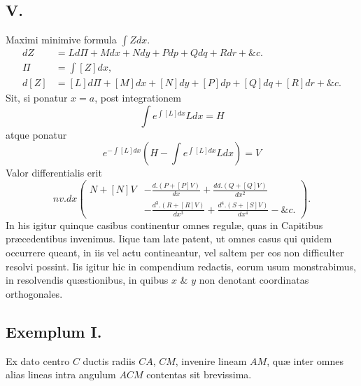 \subsection*{V.}
Maximi minimive formula $\int Zdx$.
\[\begin{aligned}dZ&=Ld\Pi+Mdx+Ndy+Pdp+Qdq+Rdr+\&c.\\\Pi&=\int[Z]dx,\\d[Z]&=[L]d\Pi+[M]dx+[N]dy+[P]dp+[Q]dq+[R]dr+\&c.\end{aligned}\]
Sit, si ponatur $x=a$, post integrationem
\[\int e^{\int[L]dx}Ldx=H\]
atque ponatur
\[e^{-\int[L]dx}\left(H-\int e^{\int[L]dx}Ldx\right)=V\]
Valor differentialis erit
\[nv.dx\left(\begin{aligned}N+[N]V&-\frac{d.(P+[P]V)}{dx}+\frac{dd.(Q+[Q]V)}{dx^2}\\&-\frac{d^3.(R+[R]V)}{dx^3}+\frac{d^4.(S+[S]V)}{dx^4}-\&c.\end{aligned}\right).\]
In his igitur quinque casibus continentur omnes regulæ, quas in Capitibus præcedentibus invenimus. Iique tam late patent, ut omnes casus qui quidem occurrere queant, in iis vel actu contineantur, vel saltem per eos non difficulter resolvi possint. Iis igitur hic in compendium redactis, eorum usum monstrabimus, in resolvendis quæstionibus, in quibus $x$ \& $y$ non denotant coordinatas orthogonales.
\subsection*{Exemplum I.}
Ex dato centro $C$ ductis radiis $CA$, $CM$, invenire lineam $AM$, quæ inter omnes alias lineas intra angulum $ACM$ contentas sit brevissima.

